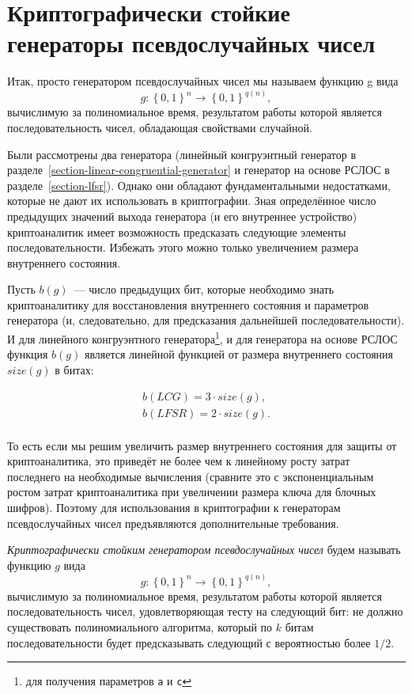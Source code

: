\section[КСГПСЧ]{Криптографически стойкие генераторы псевдослучайных чисел}\label{section-crypto-random}

Итак, просто генератором псевдослучайных чисел мы называем функцию g вида
	\[g: \left\{0, 1\right\}^{n} \to \left\{0, 1\right\}^{q\left(n\right)},\]
вычислимую за полиномиальное время, результатом работы которой является последовательность чисел, обладающая свойствами случайной.

Были рассмотрены два генератора (линейный конгруэнтный генератор в разделе~\ref{section-linear-congruential-generator} и генератор на основе РСЛОС в разделе~\ref{section-lfsr}). Однако они обладают фундаментальными недостатками, которые не дают их использовать в криптографии. Зная определённое число предыдущих значений выхода генератора (и его внутреннее устройство) криптоаналитик имеет возможность предсказать следующие элементы последовательности. Избежать этого можно только увеличением размера внутреннего состояния.

Пусть $b \left( g \right)$~--- число предыдущих бит, которые необходимо знать криптоаналитику для восстановления внутреннего состояния и параметров генератора (и, следовательно, для предсказания дальнейшей последовательности). И для линейного конгруэнтного генератора\footnote{для получения параметров \texttt{a} и \texttt{c}}, и для генератора на основе РСЛОС функция $b (g)$ является линейной функцией от размера внутреннего состояния $size\left( g \right)$ в битах:

\[\begin{array}{l}
	b \left( LCG \right) = 3 \cdot size\left( g \right), \\
	b \left( LFSR \right) = 2 \cdot size\left( g \right). \\
\end{array}\]

То есть если мы решим увеличить размер внутреннего состояния для защиты от криптоаналитика, это приведёт не более чем к линейному росту затрат последнего на необходимые вычисления (сравните это с экспоненциальным ростом затрат криптоаналитика при увеличении размера ключа для блочных шифров). Поэтому для использования в криптографии к генераторам псевдослучайных чисел предъявляются дополнительные требования.

\emph{Криптографически стойким генератором псевдослучайных чисел} будем называть функцию $g$ вида
	\[g: \left\{0, 1\right\}^{n} \to \left\{0, 1\right\}^{q\left(n\right)},\] 
вычислимую за полиномиальное время, результатом работы которой является последовательность чисел, удовлетворяющая тесту на следующий бит: не должно существовать полиномиального алгоритма, который по $k$ битам последовательности будет предсказывать следующий с вероятностью более $1/2$.

